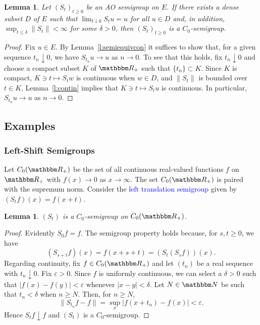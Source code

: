 \documentclass[12pt, reqno]{amsart}
\renewcommand{\leq}{\leqslant}
\renewcommand{\geq}{\geqslant}
\newcommand{\1}{\mathbbm 1}
\newcommand{\RR}{\mathbbm R}
\newcommand{\NN}{\mathbbm N}
\renewcommand{\epsilon}{\varepsilon}
\theoremstyle{plain}
\newtheorem{lemma}[theorem]{Lemma}
\theoremstyle{definition}
\newcommand{\navy}[1]{\textcolor{blue}{#1}}
\begin{document}
\begin{lemma}\label{l:aose}
    Let $(S_t)_{t \geq 0}$ be an AO semigroup on $E$.
    If there exists a dense subset $D$ of $E$ such that $\lim_{t \downarrow 0}
    S_t u = u$ for all $u \in D$ and, in addition, $\sup_{t \leq \delta} \|S_t
    \| < \infty$ for some $\delta > 0$, then $(S_t)_{t \geq 0}$ is a
    $C_0$-semigroup.
\end{lemma}

\begin{proof}
    Fix $u \in E$.  By Lemma~\ref{l:semiequivcon} it suffices to show
    that, for a given sequence $t_n \downarrow 0$, we have $S_{t_n} u \to u$ as
    $n \to 0$. 
    To see that this holds, fix $t_n \downarrow 0$ and choose a compact subset
    $K$ of $\RR_+$ such
    that $\{t_n\} \subset K$.  Since $K$ is compact, $K \ni t \mapsto S_t w$ is
    continuous when $w \in D$, and $\|S_t \|$ is bounded over $t \in K$,
    Lemma~\ref{l:contin} implies that $K \ni t \mapsto S_t u$ is continuous.
    In particular, $S_{t_n} u \to u$ as $n \to 0$. 
\end{proof}



\subsection{Examples}


\subsubsection{Left-Shift Semigroups}

Let $C_0(\RR_+)$ be the set of all continuous real-valued functions $f$ on
$\RR_+$ with $f(x) \to 0$ as $x \to \infty$.  The set $C_0(\RR_+)$ is paired
with the supremum norm.  Consider the \navy{left
translation semigroup} given by $(S_t f)(x) = f(x + t)$.

\begin{lemma}\label{l:ltsemi}
    $(S_t)$ is a $C_0$-semigroup on $C_0(\RR_+)$.  
\end{lemma}

\begin{proof}
    Evidently $S_0 f = f$.  The semigroup property holds because, for $s, t
    \geq 0$, we have
    \begin{equation*}
        (S_{s + t} f)(x) = f(x + s + t) = (S_t (S_s f))(x).
    \end{equation*}
    Regarding continuity, fix $f \in C_0(\RR_+)$ and let $(t_n)$ be a real sequence
    with $t_n \downarrow 0$.  Fix $\epsilon > 0$.  Since $f$ is uniformly
    continuous, we can select a $\delta > 0$ such that $|f(x) - f(y)| < \epsilon$
    whenever $|x-y|<\delta$.  Let $N \in \NN$ be such that $t_n < \delta$ when
    $n \geq N$.  Then, for $n \geq N$,
    \begin{equation*}
        \| S_{t_n} f - f \|
        = \sup_x | f(x + t_n)  - f(x) |
        < \epsilon.
    \end{equation*}
    Hence $S_t f \downarrow f$ and $(S_t)$ is a $C_0$-semigroup.
\end{proof}
\end{document}
